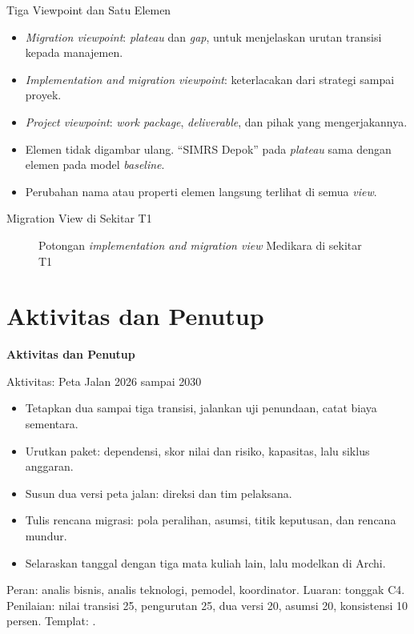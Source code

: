 \documentclass[aspectratio=169, table, 12pt]{beamer}
\begin{document}
\begin{frame}{{\Large Tiga Viewpoint dan Satu Elemen}}
  \small
  \vspace{4pt}
  \begin{itemize}
    \item \textit{Migration viewpoint}: \textit{plateau} dan \textit{gap}, untuk menjelaskan urutan
          transisi kepada manajemen.
    \item \textit{Implementation and migration viewpoint}: keterlacakan dari strategi sampai proyek.
    \item \textit{Project viewpoint}: \textit{work package}, \textit{deliverable}, dan pihak yang
          mengerjakannya.
    \item Elemen tidak digambar ulang. ``SIMRS Depok'' pada \textit{plateau} sama dengan elemen pada
          model \textit{baseline}.
    \item Perubahan nama atau properti elemen langsung terlihat di semua \textit{view}.
  \end{itemize}
\end{frame}

\begin{frame}{{\Large Migration View di Sekitar T1}}
  \centering
  \begin{figure}
    \resizebox{!}{0.60\textheight}{}
    \caption{Potongan \textit{implementation and migration view} Medikara di sekitar T1}
  \end{figure}
\end{frame}

\section{Aktivitas dan Penutup}

\begin{frame}{\hfill}
  \centering
  \Huge{\textbf{Aktivitas dan Penutup}}
\end{frame}

\begin{frame}{{\Large Aktivitas: Peta Jalan 2026 sampai 2030}}
  \small
  \begin{itemize}
    \item Tetapkan dua sampai tiga transisi, jalankan uji penundaan, catat biaya sementara.
    \item Urutkan paket: dependensi, skor nilai dan risiko, kapasitas, lalu siklus anggaran.
    \item Susun dua versi peta jalan: direksi dan tim pelaksana.
    \item Tulis rencana migrasi: pola peralihan, asumsi, titik keputusan, dan rencana mundur.
    \item Selaraskan tanggal dengan tiga mata kuliah lain, lalu modelkan di Archi.
  \end{itemize}
  \footnotesize Peran: analis bisnis, analis teknologi, pemodel, koordinator. Luaran: tonggak C4.
  Penilaian: nilai transisi 25, pengurutan 25, dua versi 20, asumsi 20, konsistensi 10 persen.
  Templat: .
\end{frame}
\end{document}
